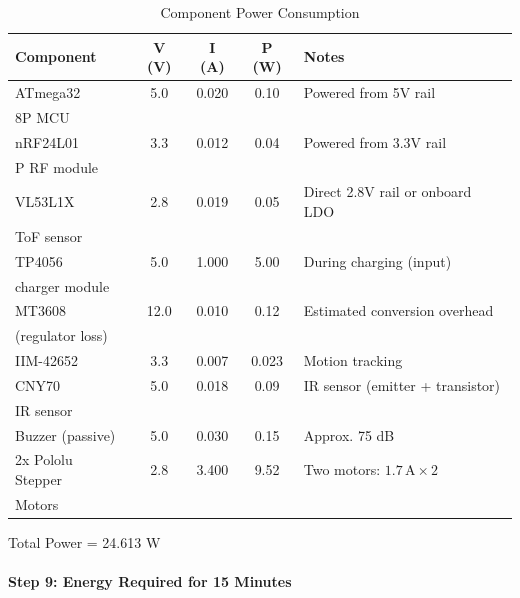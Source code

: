 \documentclass[12pt,a4paper,english]{article}
\begin{document}
\begin{table}[h]
\centering
\caption{Component Power Consumption}
\label{tab:power_consumption}
\begin{tabular}{l S[table-format=1.3] S[table-format=1.3] S[table-format=2.3] p{4cm}}
\toprule
\textbf{Component} & \textbf{V (\si{\volt})} & \textbf{I (\si{\ampere})} & \textbf{P (\si{\watt})} & \textbf{Notes} \\
\midrule
ATmega32 & 5.0 & 0.020 & 0.10 & Powered from 5V rail \\
8P MCU & & & & \\
\addlinespace

nRF24L01 & 3.3 & 0.012 & 0.04 & Powered from 3.3V rail \\
P RF module & & & & \\
\addlinespace

VL53L1X & 2.8 & 0.019 & 0.05 & Direct 2.8V rail or onboard LDO \\
ToF sensor & & & & \\
\addlinespace

TP4056 & 5.0 & 1.000 & 5.00 & During charging (input) \\
charger module & & & & \\
\addlinespace

MT3608 & 12.0 & 0.010 & 0.12 & Estimated conversion overhead \\
(regulator loss) & & & & \\
\addlinespace

IIM-42652 & 3.3 & 0.007 & 0.023 & Motion tracking \\
\addlinespace

CNY70 & 5.0 & 0.018 & 0.09 & IR sensor (emitter + transistor) \\
IR sensor & & & & \\
\addlinespace

Buzzer (passive) & 5.0 & 0.030 & 0.15 & Approx. 75 dB \\
\addlinespace

2x Pololu Stepper & 2.8 & 3.400 & 9.52 & Two motors: $1.7\,\si{\ampere} \times 2$ \\
Motors & & & & \\
\bottomrule
\end{tabular}
\end{table}

Total Power = 24.613 W

\paragraph{Step 9: Energy Required for 15 Minutes}
\end{document}

